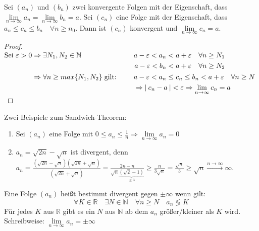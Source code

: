\documentclass[a4paper,titlepage,oneside]{article}
\def\N{\ensuremath{\mathbb{N}} }
\def\R{\ensuremath{\mathbb{R}} }
\renewcommand{\epsilon}{\ensuremath{\varepsilon} }
\def\sp{\hspace{0,1cm}}
\renewcommand{\liminf}[2][n]{\ensuremath{\lim\limits_{#1 \rightarrow \infty}{#2}}}
\newcommand{\abs}[1]{\ensuremath{\left|\:#1\:\right|}}
\newcommand{\longtoinf}[1][n]{\ensuremath{\overset{\scriptscriptstyle{#1 \to \infty}}{\longrightarrow}}}
\theoremstyle{thmstyle}
\begin{document}
\begin{subsatz}
Sei \((a_n)\text{ und }(b_n)\) zwei konvergente Folgen mit der Eigenschaft, dass \(\liminf{a_n} = \liminf{b_n} = a\).
Sei \((c_n)\) eine Folge mit der Eigenschaft, dass \(a_n \le c_n \le b_n \quad \forall n \ge n_0\).
Dann ist \((c_n)\) konvergent und \(\liminf{c_n} = a\).
\begin{proof}
\begin{math}
\begin{aligned}[t] \displaystyle \text{Sei }\epsilon > 0 &\Rightarrow \exists  N_1, N_2 \in \N \quad
&&\begin{aligned}[t] a - \epsilon < a_n < a + \epsilon & \quad \forall n \ge N_1 \\
			   a - \epsilon < b_n < a + \epsilon & \quad \forall n \ge N_2
\end{aligned} \\
&\Rightarrow \forall n \ge max\{N_1, N_2\} \sp \text{gilt: } \quad &&\begin{aligned}[t] &a-\epsilon < a_n \le c_n \le b_n < a + \epsilon \quad  \forall n \ge N \\
&\Rightarrow \abs{c_n - a} < \epsilon \Rightarrow \liminf{c_n} = a
\end{aligned}
\end{aligned}\\
\end{math}
\end{proof}
\end{subsatz}

\begin{subbsp}
Zwei Beispiele zum Sandwich-Theorem:
\begin{enumerate}
\item Sei \((a_n)\) eine Folge mit \(0 \le a_n \le \frac{1}{n} \Rightarrow \liminf{a_n} = 0\)
\item \(a_n = \sqrt{2n} - \sqrt{n}\) ist divergent, denn \\
$ \displaystyle a_n = \frac{\left(\sqrt{2n} - \sqrt{n}\right)\left(\sqrt{2n} + \sqrt{n}\right)}{\left(\sqrt{2n} + \sqrt{n}\right)} = \frac{2n - n}{\sqrt{n} \underbrace{\left(\sqrt{2} - 1\right)}_{\le3}} \ge \frac{n}{3\sqrt{n}} = \frac{\sqrt{n}}{3} \ge \sqrt{n} \longtoinf \infty $.
\end{enumerate}
\end{subbsp}

\begin{subdefi}
Eine Folge \((a_n)\) heißt bestimmt divergent gegen \(\pm \infty \) wenn gilt:
\[\forall K \in \R \quad \exists N \in \N \quad \forall n \ge N \quad  a_n \lessgtr K \]
Für jedes $K$ aus \R  gibt es ein $N$ aus \N ab dem $a_n$ größer/kleiner als $K$ wird. Schreibweise: \(\liminf{a_n} = \pm \infty \)
\end{subdefi}
\end{document}
